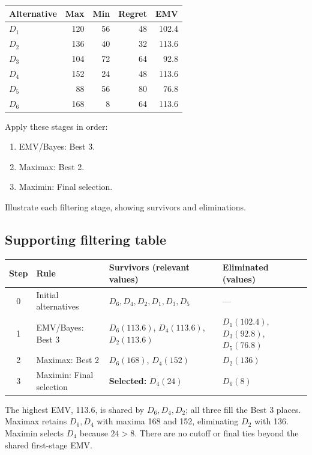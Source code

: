 \vspace{-3mm}
\begin{center}\small\setlength{\tabcolsep}{4pt}
	\begin{tabular}{lrrrr}\toprule
		Alternative & Max & Min & Regret & EMV\\ \midrule
		$D_1$ & 120 & 56 & 48 & 102.4\\
		$D_2$ & 136 & 40 & 32 & 113.6\\
		$D_3$ & 104 & 72 & 64 & 92.8\\
		$D_4$ & 152 & 24 & 48 & 113.6\\
		$D_5$ & 88 & 56 & 80 & 76.8\\
		$D_6$ & 168 & 8 & 64 & 113.6\\
		\bottomrule
	\end{tabular}
\end{center}
\vspace{-3mm}

Apply these stages in order:
\begin{enumerate}[leftmargin=*]
	\item EMV/Bayes: Best 3.
	\item Maximax: Best 2.
	\item Maximin: Final selection.
\end{enumerate}
Illustrate each filtering stage, showing survivors and eliminations.
\label{sol:q3table}
\subsection*{Supporting filtering table}
\begin{center}\small
\begin{tabularx}{\textwidth}{@{}c >{\raggedright\arraybackslash}p{} >{\raggedright\arraybackslash}X >{\raggedright\arraybackslash}p{}@{}}
\toprule
Step & Rule & Survivors (relevant values) & Eliminated (values)\\\midrule
0 & Initial alternatives & $D_6,D_4,D_2,D_1,D_3,D_5$ & ---\\
1 & EMV/Bayes: Best 3 & $D_6(113.6)$, $D_4(113.6)$, $D_2(113.6)$ & $D_1(102.4)$, $D_3(92.8)$, $D_5(76.8)$\\
2 & Maximax: Best 2 & $D_6(168)$, $D_4(152)$ & $D_2(136)$\\
3 & Maximin: Final selection & \textbf{Selected:} $D_4(24)$ & $D_6(8)$\\
\bottomrule\end{tabularx}
\end{center}
The highest EMV, 113.6, is shared by $D_6,D_4,D_2$; all three fill the Best 3 places. Maximax retains $D_6,D_4$ with maxima 168 and 152, eliminating $D_2$ with 136. Maximin selects $D_4$ because $24>8$. There are no cutoff or final ties beyond the shared first-stage EMV.
\secInicio[sec:q3]
\clearpage
{}\label{sol:q3tree}

